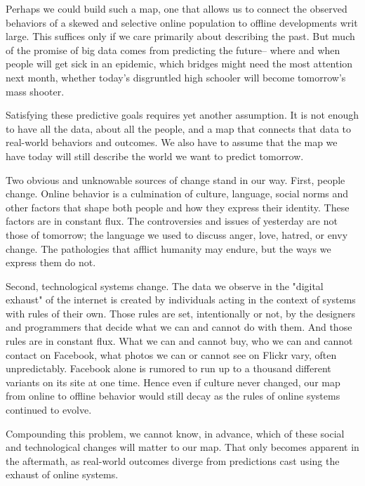 \documentclass[12pt]{article}
\begin{document}
Perhaps we could build such a map, one that allows us to connect the
observed behaviors of a skewed and selective online population to
offline developments writ large. This suffices only if we care
primarily about describing the past. But much of the promise of big
data comes from predicting the future-- where and when people will get
sick in an epidemic, which bridges might need the most attention next
month, whether today's disgruntled high schooler will become
tomorrow's mass shooter.

Satisfying these predictive goals requires yet another assumption. It
is not enough to have all the data, about all the people, and a map
that connects that data to real-world behaviors and outcomes. We also
have to assume that the map we have today will still describe the
world we want to predict tomorrow. 

Two obvious and unknowable sources of change stand in our way. First,
people change. Online behavior is a culmination of culture, language,
social norms and other factors that shape both people and how they
express their identity. These factors are in constant flux. The
controversies and issues of yesterday are not those of tomorrow; the
language we used to discuss anger, love, hatred, or envy change.
The pathologies that afflict humanity may endure, but the ways we
express them do not. 

Second, technological systems change. The data we observe in the
"digital exhaust" of the internet is created by individuals acting in
the context of systems with rules of their own. Those rules are set,
intentionally or not, by the designers and programmers that decide
what we can and cannot do with them. And those rules are in constant
flux. What we can and cannot buy, who we can and cannot contact on
Facebook, what photos we can or cannot see on Flickr vary, often
unpredictably. Facebook alone is rumored to run up to a thousand
different variants on its site at one time. Hence even if culture
never changed, our map from online to offline behavior would still
decay as the rules of online systems continued to evolve.

Compounding this problem, we cannot know, in advance, which of these
social and technological changes will matter to our map. That only
becomes apparent in the aftermath, as real-world outcomes diverge from
predictions cast using the exhaust of online systems.
\end{document}
